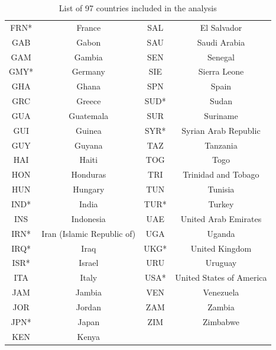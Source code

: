 \documentclass[a4paper]{article}
\begin{document}
\begin{appendices}
\begin{table}[H]
\begin{tabular}{c|c||c|c}
			FRN* & France&SAL & El Salvador\\
			GAB & Gabon 	&SAU & Saudi Arabia\\
			GAM & Gambia	&SEN &Senegal \\
				GMY* & Germany& SIE&Sierra Leone \\
			 	GHA & Ghana	&SPN & Spain\\
			GRC & Greece&SUD* &Sudan \\
				GUA & Guatemala &SUR&Suriname\\
				GUI &Guinea&SYR* & Syrian Arab Republic\\
		GUY & Guyana	&TAZ & Tanzania\\
				HAI & Haiti  &TOG & Togo\\
					HON &Honduras&TRI & Trinidad and Tobago\\
			HUN & Hungary 	&TUN & Tunisia\\
				IND* & India&TUR*& Turkey\\
			INS & Indonesia		&UAE & United Arab Emirates\\
	IRN* & Iran (Islamic Republic of)		& UGA & Uganda\\
			IRQ* & Iraq &UKG* & United Kingdom\\
				ISR* & Israel&URU & Uruguay\\
			ITA & Italy		&USA* & United States of America\\
		JAM& Jambia	&VEN & Venezuela\\
			JOR & Jordan	&ZAM & Zambia\\
			JPN* & Japan	&ZIM & Zimbabwe\\		
				KEN & Kenya&&\\
				\hline
\end{tabular}
	\label{table:importantvotes}
	\caption {List of 97 countries included in the analysis}
\end{table}


\end{appendices}
\end{document}
